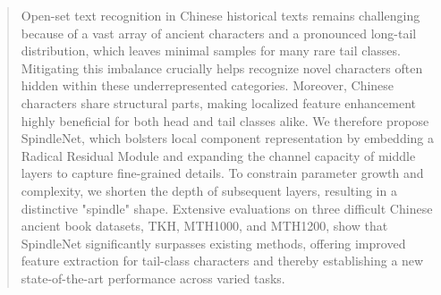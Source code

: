 \begin{abstract}
Open-set text recognition in Chinese historical texts remains challenging because of a vast array of ancient characters and a pronounced long-tail distribution, which leaves minimal samples for many rare tail classes. Mitigating this imbalance crucially helps recognize novel characters often hidden within these underrepresented categories. Moreover, Chinese characters share structural parts, making localized feature enhancement highly beneficial for both head and tail classes alike. We therefore propose SpindleNet, which bolsters local component representation by embedding a Radical Residual Module and expanding the channel capacity of middle layers to capture fine-grained details. To constrain parameter growth and complexity, we shorten the depth of subsequent layers, resulting in a distinctive "spindle" shape. Extensive evaluations on three difficult Chinese ancient book datasets, TKH, MTH1000, and MTH1200, show that SpindleNet significantly surpasses existing methods, offering improved feature extraction for tail-class characters and thereby establishing a new state-of-the-art performance across varied tasks.
\end{abstract}
